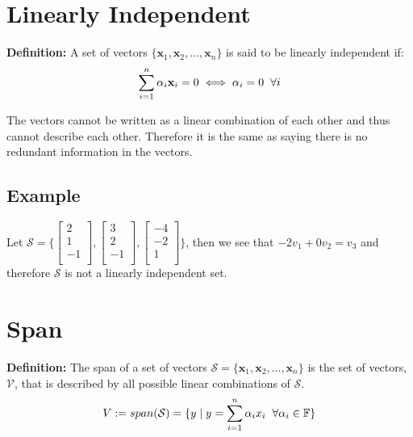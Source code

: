 \documentclass[a4paper]{article}
\begin{document}
\section{Linearly Independent}
\textbf{Definition:} A set of vectors $\{\mathbf{x}_{1},\mathbf{x}_{2},\ldots,\mathbf{x}_{n}\}$ is said to be linearly independent if:
$$
\sum_{i = 1}^{n}\alpha_{i}\mathbf{x}_{i} = 0 \iff \alpha_{i} = 0 \hspace{2mm} \forall i
$$

The vectors cannot be written as a linear combination of each other and thus cannot describe each other. Therefore it is the same as saying there is no redundant information in the vectors.

\subsection{Example}
Let $\mathcal{S} = \Bigg\{\begin{bmatrix}2\\1\\-1\\\end{bmatrix},\begin{bmatrix}3\\2\\-1\\\end{bmatrix},\begin{bmatrix}-4\\-2\\1\\\end{bmatrix}\Bigg\}$, then we see that $-2v_{1} + 0v_{2} = v_{3}$ and therefore $\mathcal{S}$ is not a linearly independent set.\\

\section{Span}
\textbf{Definition:} The span of a set of vectors $\mathcal{S} = \{\mathbf{x}_{1}, \mathbf{x}_{2}, \ldots, \mathbf{x}_{n}\}$ is the set of vectors, $\mathcal{V}$, that is described by all possible linear combinations of $\mathcal{S}$.
$$
V := span(\mathcal{S}) = \{y \mid y=\sum_{i = 1}^{n}\alpha_{i}x_{i}\hspace{2mm}\forall\alpha_{i}\in\mathbb{F}\}
$$ 
\end{document}
